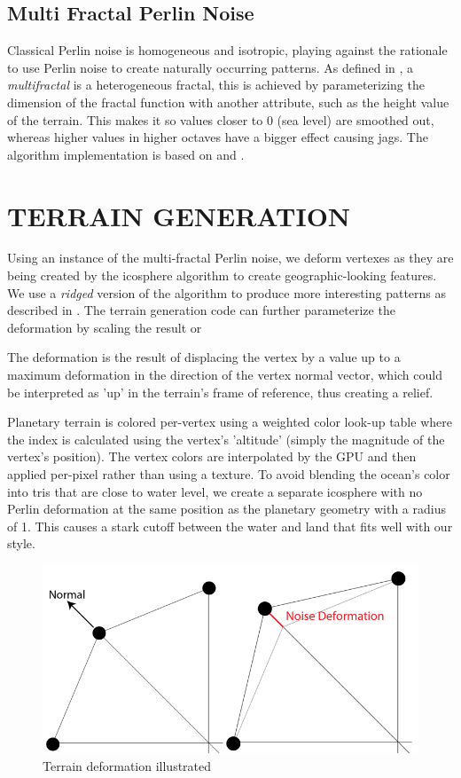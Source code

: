 \documentclass[a4paper,twoside]{article}
\begin{document}
\subsection{Multi Fractal Perlin Noise}
\label{sec:mfpnois}
Classical Perlin noise is homogeneous and isotropic, playing against the rationale to use Perlin noise to create naturally occurring patterns.  As defined in \cite{ondrej07}, a \textit{multifractal} is a heterogeneous fractal, this is achieved by parameterizing the dimension of the fractal function with another attribute, such as the height value of the terrain. This makes it so values closer to 0 (sea level) are smoothed out, whereas higher values in higher octaves have a bigger effect causing jags.  The algorithm implementation is based on \cite{pnoise} and \cite{ondrej07}.

\section{\uppercase{Terrain Generation}}
\label{sec:tgeneration}

\noindent Using an instance of the multi-fractal Perlin noise, we deform vertexes as they are being created by the icosphere algorithm to create geographic-looking features. We use a \textit{ridged} version of the algorithm to produce more interesting patterns as described in \cite{ondrej07}. The terrain generation code can further parameterize the deformation by scaling the result or 

The deformation is the result of displacing the vertex by a value up to a maximum deformation in the direction of the vertex normal vector, which could be interpreted as 'up' in the terrain's frame of reference, thus creating a relief.

Planetary terrain is colored per-vertex using a weighted color look-up table where the index is calculated using the vertex's 'altitude' (simply the magnitude of the vertex's position). The vertex colors are interpolated by the GPU and then applied per-pixel rather than using a texture. To avoid blending the ocean's color into tris that are close to water level, we create a separate icosphere with no Perlin deformation at the same position as the planetary geometry with a radius of 1. This causes a stark cutoff between the water and land that fits well with our style.

\begin{figure}
\centering
\includegraphics[scale=0.25]{./images/normals_deformation.png}
\caption{Terrain deformation illustrated}
\label{fig_tda}
\end{figure}
\end{document}
